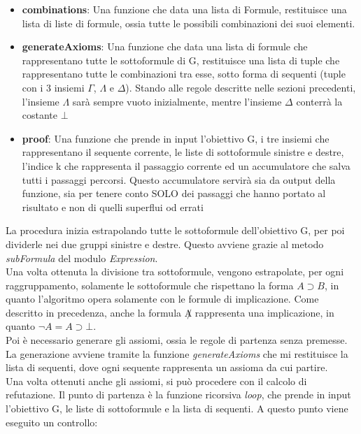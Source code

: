 \documentclass[\main/tesi.tex]{subfiles}
\begin{document}
\begin{itemize}
\begin{itemize}
              \item \textbf{combinations}: Una funzione che data una lista di Formule, restituisce una lista di liste di formule, ossia tutte le possibili combinazioni dei suoi elementi.
              \item \textbf{generateAxioms}: Una funzione che data una lista di formule che rappresentano tutte le sottoformule di G, restituisce una lista di tuple che rappresentano tutte le combinazioni tra esse, sotto forma di sequenti (tuple con i 3 insiemi $\Gamma$, $\Lambda$ e $\Delta$). Stando alle regole descritte nelle sezioni precedenti, l'insieme $\Lambda$ sarà sempre vuoto inizialmente, mentre l'insieme $\Delta$ conterrà la costante $\bot$
              \item \textbf{proof}: Una funzione che prende in input l'obiettivo G, i tre insiemi che rappresentano il sequente corrente, le liste di sottoformule sinistre e destre, l'indice k che rappresenta il passaggio corrente ed un accumulatore che salva tutti i passaggi percorsi. Questo accumulatore servirà sia da output della funzione, sia per tenere conto SOLO dei passaggi che hanno portato al risultato e non di quelli superflui od errati
          \end{itemize}
\end{itemize}
La procedura inizia estrapolando tutte le sottoformule dell'obiettivo G, per poi dividerle nei due gruppi sinistre e destre. Questo avviene grazie al metodo \textit{subFormula} del modulo \textit{Expression}. \\
Una volta ottenuta la divisione tra sottoformule, vengono estrapolate, per ogni raggruppamento, solamente le sottoformule che rispettano la forma $A \supset B$, in quanto l'algoritmo opera solamente con le formule di implicazione. Come descritto in precedenza, anche la formula $\not A$ rappresenta una implicazione, in quanto $\neg A = A \supset \bot$. \\
Poi è necessario generare gli assiomi, ossia le regole di partenza senza premesse. La generazione avviene tramite la funzione \textit{generateAxioms} che mi restituisce la lista di sequenti, dove ogni sequente rappresenta un assioma da cui partire. \\
Una volta ottenuti anche gli assiomi, si può procedere con il calcolo di refutazione. Il punto di partenza è la funzione ricorsiva \textit{loop}, che prende in input l'obiettivo G, le liste di sottoformule e la lista di sequenti. A questo punto viene eseguito un controllo:
\end{document}
